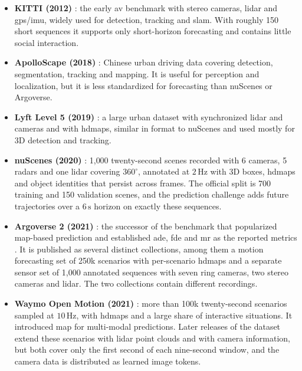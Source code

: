 \begin{itemize}
    \item \textbf{KITTI (2012)} \cite{Geiger2012KITTI}: the early \ac{av} benchmark with stereo cameras,
    \ac{lidar} and \ac{gps}/\ac{imu}, widely used for detection, tracking and \ac{slam}. With roughly 150
    short sequences it supports only short-horizon forecasting and contains little social interaction.
    \item \textbf{ApolloScape (2018)} \cite{Huang2018ApolloScape}: Chinese urban driving data covering
    detection, segmentation, tracking and mapping. It is useful for perception and localization, but it is
    less standardized for forecasting than nuScenes or Argoverse.
    \item \textbf{Lyft Level 5 (2019)} \cite{Kesten2019Lyft}: a large urban dataset with synchronized
    \ac{lidar} and cameras and with \acp{hdmap}, similar in format to nuScenes and used mostly for 3D
    detection and tracking.
    \item \textbf{nuScenes (2020)} \cite{Caesar2020nuScenes}: 1{,}000 twenty-second scenes recorded with
    6 cameras, 5 radars and one \ac{lidar} covering $360^\circ$, annotated at \(2\,\mathrm{Hz}\) with 3D
    boxes, \acp{hdmap} and object identities that persist across frames. The official split is 700 training
    and 150 validation scenes, and the prediction challenge adds future trajectories over a
    \(6\,\mathrm{s}\) horizon on exactly these sequences.
    \item \textbf{Argoverse 2 (2021)} \cite{Wilson2021Argoverse2}: the successor of the benchmark that
    popularized map-based prediction and established \acs{ade}, \acs{fde} and \acs{mr} as the reported
    metrics \cite{Chang2019Argoverse}. It is published as several distinct collections, among them a motion
    forecasting set of 250k scenarios with per-scenario \acp{hdmap} and a separate sensor set of 1{,}000
    annotated sequences with seven ring cameras, two stereo cameras and \ac{lidar}. The two collections
    contain different recordings.
    \item \textbf{Waymo Open Motion (2021)} \cite{Ettinger2021WOMD}: more than 100k twenty-second scenarios
    sampled at \(10\,\mathrm{Hz}\), with \acp{hdmap} and a large share of interactive situations. It
    introduced \acs{map} for multi-modal predictions. Later releases of the dataset extend these scenarios
    with \ac{lidar} point clouds \cite{Chen2024WOMDLiDAR} and with camera information, but both cover only
    the first second of each nine-second window, and the camera data is distributed as learned image tokens.
\end{itemize}

